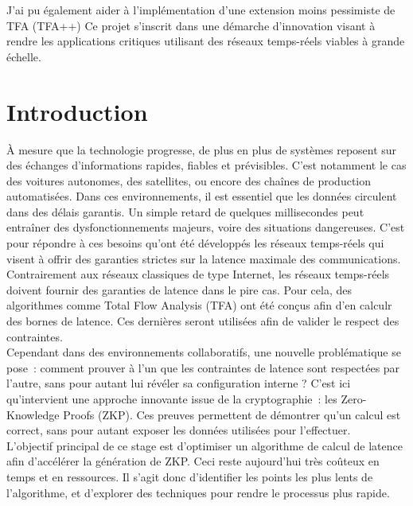 \documentclass[12pt]{report}
\begin{document}
\vspace{0.2cm}

J'ai pu également aider à l'implémentation d'une extension moins pessimiste de TFA (TFA++)
Ce projet s'inscrit dans une démarche d'innovation visant à rendre 
les applications critiques utilisant des réseaux temps-réels viables à
grande échelle.


\tableofcontents
\newpage

\chapter{Introduction}
\setcounter{page}{1}

À mesure que la technologie progresse, de plus en plus de systèmes 
reposent sur des échanges d'informations rapides, fiables et 
prévisibles. C'est notamment le cas des voitures autonomes,
des satellites, ou encore des chaînes de 
production automatisées. Dans ces environnements, il est essentiel que 
les données circulent dans des 
délais garantis. Un simple retard de quelques millisecondes peut entraîner 
des dysfonctionnements majeurs, voire des situations dangereuses. 
C'est pour répondre à ces besoins qu'ont été développés les réseaux 
temps-réels qui visent à offrir des garanties strictes sur la latence 
maximale des communications.\\

Contrairement aux réseaux classiques de type Internet,
les réseaux temps-réels doivent fournir des garanties de latence dans le pire cas. Pour cela, des algorithmes comme Total Flow Analysis 
(TFA) ont été conçus afin d'en calculr des bornes de latence. Ces dernières seront utilisées 
afin de valider le respect des contraintes.\\

Cependant dans des environnements collaboratifs, une nouvelle problématique 
se pose : comment prouver à l'un que les contraintes de latence sont 
respectées par l'autre, sans pour autant lui révéler sa configuration interne ? 
C'est ici qu'intervient une approche innovante issue de la cryptographie : les Zero-Knowledge Proofs 
(ZKP). Ces preuves permettent de démontrer qu'un calcul est correct, 
sans pour autant exposer les données utilisées pour l'effectuer.\\

L'objectif principal de ce stage est d'optimiser un algorithme de calcul de latence 
afin d'accélérer la génération de ZKP. Ceci reste aujourd'hui 
très coûteux en temps et en ressources. Il s'agit donc d'identifier les 
points les plus lents de l'algorithme, et d'explorer des techniques pour rendre le
processus plus rapide.\\
\end{document}
